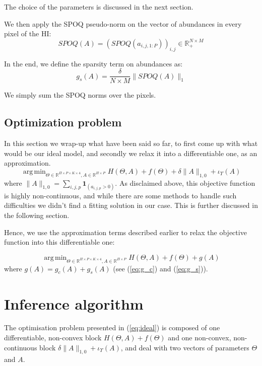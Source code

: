 \documentclass[conference]{IEEEtran}
\DeclareMathOperator*{\argmin}{arg\,min}
\begin{document}
The choice of the parameters is discussed in the next section.

We then apply the SPOQ pseudo-norm on the vector of abundances in every pixel of the HI:
$$SPOQ(A) = (SPOQ(a_{i,j,1:P}))_{i, j} \in \mathbb{R}_+^{N \times M}$$

In the end, we define the sparsity term on abundances as:
\begin{equation}\label{eq:g_s}
  g_s(A) = \frac{\delta}{N \times M} \| SPOQ(A) \|_{1}
\end{equation}

We simply sum the SPOQ norms over the pixels.

\subsection{Optimization problem}
In this section we wrap-up what have been said so far, to first come up with what would be our ideal model, and secondly we relax it into a differentiable one, as an approximation.
\begin{equation}
  \label{eq:ideal}
  \argmin_{\Theta \in \mathbb{R}^{\Pi \times P \times K \times 4}, A \in \mathbb{R}^{\Pi \times P}} H(\Theta, A) + f(\Theta) + \delta \|A\|_{1,0} + \iota_\Upsilon (A)
\end{equation}
where $\|A\|_{1,0} = \sum_{i,j,p} \mathbf{1}_{(a_{i,j,p} > 0)}$. As disclaimed above, this objective function is highly non-continuous, and while there are some methods to handle such difficulties we didn't find a fitting solution in our case. This is further discussed in the following section.

Hence, we use the approximation terms described earlier to relax the objective function into this differentiable one:

\begin{equation}
  \label{eq:general}
  \argmin_{\Theta \in \mathbb{R}^{\Pi \times P \times K \times 4}, A \in \mathbb{R}^{\Pi \times P}} H(\Theta, A) + f(\Theta) + g(A)
\end{equation}
where $g(A) = g_c(A) + g_s(A)$ (see (\ref{eq:g_c}) and (\ref{eq:g_s})).


\section{Inference algorithm}

The optimisation problem presented in (\ref{eq:ideal}) is composed of one differentiable, non-convex block $H(\Theta, A) + f(\Theta)$ and one non-convex, non-continuous block $\delta\|A\|_{1,0} + \iota_\Upsilon (A)$, and deal with two vectors of parameters $\Theta$ and $A$.
\end{document}

